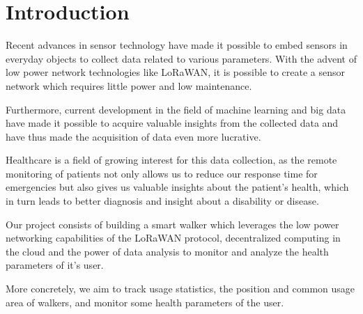 \chapter{Introduction}
\label{cha:introduction}

Recent advances in sensor technology have made it possible to embed sensors in everyday objects to collect data related to various parameters. With the advent of low power network technologies like LoRaWAN, it is possible to create a sensor network which requires little power and low maintenance.

Furthermore, current development in the field of machine learning and big data have made it possible to acquire valuable insights from the collected data and have thus made the acquisition of data even more lucrative.

Healthcare is a field of growing interest for this data collection, as the remote monitoring of patients not only allows us to reduce our response time for emergencies but also gives us valuable insights about the patient's health, which in turn leads to better diagnosis and insight about a disability or disease.

Our project consists of building a smart walker which leverages the low power networking capabilities of the LoRaWAN protocol, decentralized computing in the cloud and the power of data analysis to monitor and analyze the health parameters of it's user.

More concretely, we aim to track usage statistics, the position and common usage area of walkers, and monitor some health parameters of the user.

